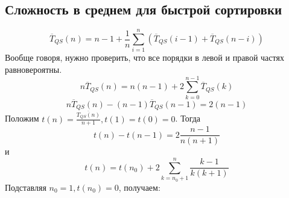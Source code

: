 \documentclass[11pt]{article}
\begin{document}
\subsection{Сложность в среднем для быстрой сортировки}
\label{sec:orgb03cdde}
   \begin{equation}
\overline{T}_{QS}(n) = n - 1 + \frac1n\sum_{i = 1}^n\left(\overline{T}_{QS}(i - 1) +
\overline{T}_{QS}(n - i)\right)
   \end{equation}
Вообще говоря, нужно проверить, что все порядки в левой и правой частях равновероятны.
\begin{equation}
n\overline{T}_{QS}(n) = n(n - 1) + 2\sum_{k = 0}^{n - 1}\overline{T}_{QS}(k)
\end{equation}
\begin{equation}
n\overline{T}_{QS}(n) - (n - 1)\overline{T}_{QS}(n - 1) = 2(n - 1)
\end{equation}
Положим $t(n) = \frac{\overline{T_{QS}(n)}}{n + 1}, t(1) = t(0) = 0$. Тогда
\begin{equation}
t(n) - t(n - 1) = 2\frac{n - 1}{n(n + 1)}
\end{equation}
и
\begin{equation}
t(n) = t(n_0) + 2\sum_{k = n_0 + 1}^n\frac{k - 1}{k(k + 1)}
\end{equation}
Подставляя $n_0 = 1, t(n_0) = 0$, получаем:
\end{document}
